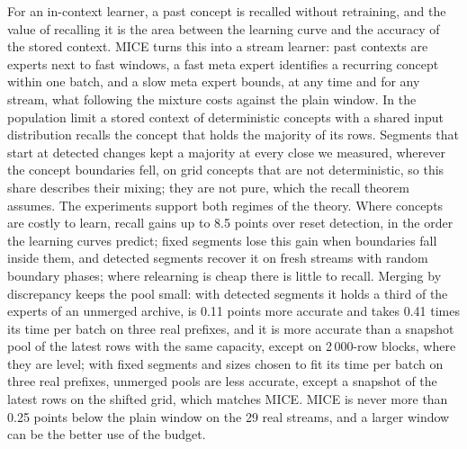 \documentclass[11pt]{article}
\theoremstyle{plain}
\theoremstyle{definition}
\theoremstyle{remark}
\newcommand{\method}{\textsc{MICE}}   %
\begin{document}
For an in-context learner, a past concept is recalled without retraining, and the value of recalling it is the area
between the learning curve and the accuracy of the stored context. \method{} turns this into a stream learner: past
contexts are experts next to fast windows, a fast meta expert identifies a recurring concept within one batch, and a
slow meta expert bounds, at any time and for any stream, what following the mixture costs against the plain window.
In the population limit a stored context of deterministic concepts with a shared input distribution recalls the
concept that holds the majority of its rows. Segments that start at detected changes kept a majority at every close
we measured, wherever the concept boundaries fell, on grid concepts that are not deterministic, so this share
describes their mixing; they are not pure, which the recall theorem assumes. The experiments support both regimes of the theory. Where
concepts are costly to learn, recall gains up to 8.5 points over reset detection, in the order the learning curves
predict; fixed segments lose this gain when boundaries fall inside them, and detected segments recover it on fresh
streams with random boundary phases; where relearning is cheap there is little to recall. Merging by discrepancy
keeps the pool small: with detected segments it holds a third of the experts of an unmerged archive, is 0.11
points more accurate and takes 0.41 times its time per batch on three real prefixes, and it is more accurate than
a snapshot pool of the latest rows with the same capacity, except on 2\,000-row blocks, where they are level; with fixed segments and sizes chosen to fit its time per batch on three real prefixes, unmerged
pools are less accurate, except a snapshot of the latest rows on the shifted grid, which matches \method{}. \method{} is never more than 0.25 points below the plain window on the 29 real streams, and a larger window can be the better use of the budget.
\end{document}
